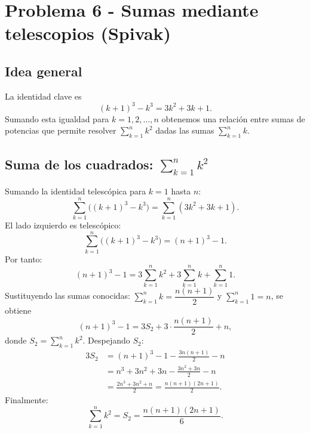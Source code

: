 
\section*{Problema 6 - Sumas mediante telescopios (Spivak)}

\subsection*{Idea general}

La identidad clave es
\[
(k+1)^3-k^3=3k^2+3k+1.
\]
Sumando esta igualdad para $k=1,2,\dots,n$ obtenemos una relación entre sumas de potencias que permite resolver \(\sum_{k=1}^n k^2\) dadas las sumas \(\sum_{k=1}^n k\).

\subsection*{Suma de los cuadrados: $\displaystyle\sum_{k=1}^n k^2$}

Sumando la identidad telescópica para $k=1$ hasta $n$:
\[
\sum_{k=1}^n\big((k+1)^3-k^3\big)=\sum_{k=1}^n (3k^2+3k+1).
\]
El lado izquierdo es telescópico:
\[
\sum_{k=1}^n\big((k+1)^3-k^3\big)=(n+1)^3-1.
\]
Por tanto:
\[
(n+1)^3-1=3\sum_{k=1}^n k^2+3\sum_{k=1}^n k+\sum_{k=1}^n 1.
\]
Sustituyendo las sumas conocidas: $\sum_{k=1}^n k=\dfrac{n(n+1)}{2}$ y $\sum_{k=1}^n1=n$, se obtiene
\[
(n+1)^3-1=3S_2+3\cdot\frac{n(n+1)}{2}+n,
\]
donde $S_2=\sum_{k=1}^n k^2$. Despejando $S_2$:
\begin{align*}
3S_2 &= (n+1)^3-1-\frac{3n(n+1)}{2}-n \\[4pt]
&= n^3+3n^2+3n - \frac{3n^2+3n}{2}-n \\[4pt]
&= \frac{2n^3+3n^2+n}{2} = \frac{n(n+1)(2n+1)}{2}.
\end{align*}
Finalmente:
\[
\sum_{k=1}^n k^2 = S_2 = \frac{n(n+1)(2n+1)}{6}.
\]

